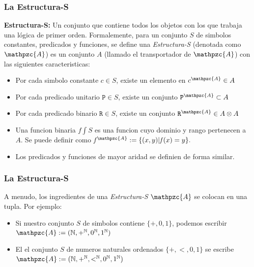 \documentclass{beamer}
\begin{document}
\begin{frame}
    \frametitle{La Estructura-S}
    {\bf Estructura-S:} Un conjunto que contiene todos los objetos con los que trabaja
    una l\'ogica de primer orden. Formalemente, para un conjunto $S$ de simbolos
    constantes, predicados y funciones, se define una \emph{Estructura-S} (denotada
    como $\mathpzc{A}$) es un conjunto $A$ (llamado el transportador de $\mathpzc{A}$)
    con las siguientes caracteristicas:
    \begin{itemize}
        \item{Por cada simbolo constante $c \in S$, existe un elemento en $c^\mathpzc{A}\in A$}
        \item{Por cada predicado unitario $\mathtt{P}\in S$, existe un conjunto $\mathtt{P}^\mathpzc{A}\subset A$}
        \item{Por cada predicado binario $\mathtt{R}\in S$, existe un conjunto $\mathtt{R}^\mathpzc{A}\in A\otimes A$}
        \item{Una funcion binaria $\mathit{f}\int S$ es una funcion cuyo dominio y rango pertenecen a $A$.
            Se puede definir como $\mathit{f}^\mathpzc{A}:=\{(x,y)|\mathit{f}(x)=y\}.$}
        \item{Los predicados y funciones de mayor aridad se definien de forma similar.}
    \end{itemize}
\end{frame}

\begin{frame}
    \frametitle{La Estructura-S}
    A menudo, los ingredientes de una \emph{Estructura-S} $\mathpzc{A}$ se colocan en
    una tupla. Por ejemplo:
    \begin{itemize}
        \item{Si nuestro conjunto $S$ de simbolos contiene $\{+,0,1\}$, podemos
            escribir $\mathpzc{A}:=(\mathbb{N}, +^{\mathbb{N}}, 0^{\mathbb{N}}, 1^{\mathbb{N}})$}
        \item{El el conjunto $S$ de numeros naturales ordenados $\{+,\mathtt{<},0,1\}$
            se escribe $\mathpzc{A}:=(\mathbb{N}, +^{\mathbb{N}}, \mathtt{<}^{\mathbb{N}}, 0^{\mathbb{N}}, 1^{\mathbb{N}})$}
    \end{itemize}
\end{frame}
\end{document}
